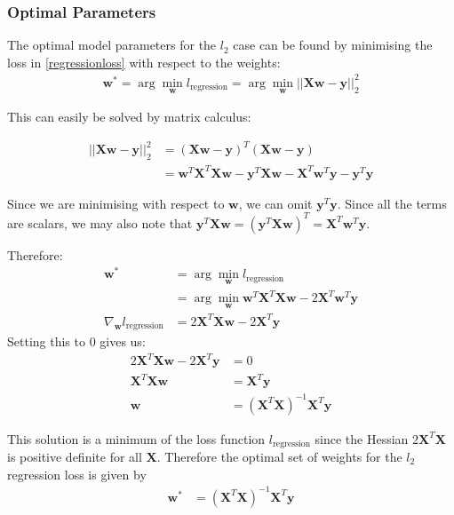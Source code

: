 \subsubsection{Optimal Parameters}
The optimal model parameters for the $l_2$ case can be found by minimising the loss in \ref{regressionloss} with respect to the weights: 
\begin{align}
    \mathbf{w}^* = \arg \min_{\mathbf{w}}l_{\mathrm{regression}} = \arg \min_{\mathbf{w}} ||\mathbf{X}\mathbf{w} - \mathbf{y}||_2^2 
\end{align}

This can easily be solved by matrix calculus:
 
 \begin{align*}
     ||\mathbf{X}\mathbf{w} - \mathbf{y}||_2^2  &= (\mathbf{X}\mathbf{w} - \mathbf{y})^T(\mathbf{X}\mathbf{w} - \mathbf{y}) \\
     &= \mathbf{w}^T\mathbf{X}^T \mathbf{X}\mathbf{w} - \mathbf{y}^T\mathbf{X}\mathbf{w} - \mathbf{X}^T\mathbf{w}^T\mathbf{y} - \mathbf{y}^T\mathbf{y}
 \end{align*}
 
 Since we are minimising with respect to $\mathbf{w}$, we can omit $\mathbf{y}^T\mathbf{y}$. Since all the terms are scalars, we may also note that $\mathbf{y}^T\mathbf{X}\mathbf{w} = (\mathbf{y}^T\mathbf{X}\mathbf{w})^T = 
 \mathbf{X}^T\mathbf{w}^T\mathbf{y} $. 
 
 Therefore: 
\begin{align*}
    \mathbf{w}^* &= \arg \min_{\mathbf{w}}l_{\mathrm{regression}} \\ 
    &= \arg \min_{\mathbf{w}} \mathbf{w}^T\mathbf{X}^T \mathbf{X}\mathbf{w}  - 2\mathbf{X}^T\mathbf{w}^T\mathbf{y} \\
    \nabla_{\mathbf{w}} l_{\mathrm{regression}} &= 2
\mathbf{X}^T \mathbf{X}\mathbf{w} - 2\mathbf{X}^T\mathbf{y}
\end{align*}
Setting this to $0$ gives us:
\begin{align*}
2
\mathbf{X}^T \mathbf{X}\mathbf{w} - 2\mathbf{X}^T\mathbf{y} &= 0 \\
\mathbf{X}^T \mathbf{X}\mathbf{w} &= \mathbf{X}^T\mathbf{y} \\
\mathbf{w} &= (\mathbf{X}^T \mathbf{X})^{-1}\mathbf{X}^T\mathbf{y}
\end{align*}

This solution is a minimum of the loss function $l_{\mathrm{regression}}$ since the Hessian $2\mathbf{X}^T\mathbf{X}$ is positive definite for all $\mathbf{X}$. Therefore the optimal set of weights for the $l_2$ regression loss is given by 
\begin{align}
    \mathbf{w}^* &= (\mathbf{X}^T \mathbf{X})^{-1}\mathbf{X}^T\mathbf{y}
\end{align}

